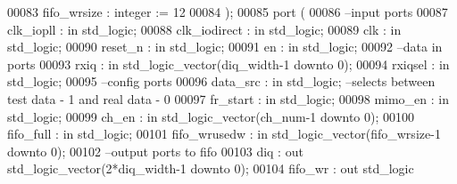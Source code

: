 \begin{DoxyCode}
00083                 fifo_wrsize     : \textcolor{comment}{integer}   := \textcolor{vhdllogic}{}\textcolor{vhdllogic}{12}
00084                 );
00085   \textcolor{keywordflow}{port} (
00086 \textcolor{keyword}{      --input ports}
00087         clk_iopll       : \textcolor{keywordflow}{in} \textcolor{comment}{std\_logic};
00088         clk_iodirect    : \textcolor{keywordflow}{in} \textcolor{comment}{std\_logic}; 
00089       clk               : \textcolor{keywordflow}{in} \textcolor{comment}{std\_logic};
00090       reset_n           : \textcolor{keywordflow}{in} \textcolor{comment}{std\_logic};
00091         en                  : \textcolor{keywordflow}{in} \textcolor{comment}{std\_logic};
00092 \textcolor{keyword}{        --data in ports}
00093         rxiq                : \textcolor{keywordflow}{in} \textcolor{comment}{std\_logic\_vector}(diq_width\textcolor{vhdlchar}{-}\textcolor{vhdllogic}{}\textcolor{vhdllogic}{1} \textcolor{keywordflow}{downto} \textcolor{vhdllogic}{}\textcolor{vhdllogic}{0});
00094         rxiqsel         : \textcolor{keywordflow}{in} \textcolor{comment}{std\_logic};
00095 \textcolor{keyword}{        --config ports}
00096         data_src            : \textcolor{keywordflow}{in} \textcolor{comment}{std\_logic}; \textcolor{keyword}{--selects between test data  - 1 and real data - 0  }
00097         fr_start            : \textcolor{keywordflow}{in} \textcolor{comment}{std\_logic};
00098         mimo_en         : \textcolor{keywordflow}{in} \textcolor{comment}{std\_logic};
00099         ch_en               : \textcolor{keywordflow}{in} \textcolor{comment}{std\_logic\_vector}(ch_num\textcolor{vhdlchar}{-}\textcolor{vhdllogic}{}\textcolor{vhdllogic}{1} \textcolor{keywordflow}{downto} \textcolor{vhdllogic}{}\textcolor{vhdllogic}{0});
00100         fifo_full       : \textcolor{keywordflow}{in} \textcolor{comment}{std\_logic};
00101         fifo_wrusedw    : \textcolor{keywordflow}{in} \textcolor{comment}{std\_logic\_vector}(fifo_wrsize\textcolor{vhdlchar}{-}\textcolor{vhdllogic}{}\textcolor{vhdllogic}{1} \textcolor{keywordflow}{downto} \textcolor{vhdllogic}{}\textcolor{vhdllogic}{0});  
00102 \textcolor{keyword}{      --output ports to fifo}
00103         diq             : \textcolor{keywordflow}{out} \textcolor{comment}{std\_logic\_vector}(\textcolor{vhdllogic}{}\textcolor{vhdllogic}{2}*diq_width\textcolor{vhdlchar}{-}\textcolor{vhdllogic}{}\textcolor{vhdllogic}{1} \textcolor{keywordflow}{downto} \textcolor{vhdllogic}{}\textcolor{vhdllogic}{0});
00104         fifo_wr         : \textcolor{keywordflow}{out} \textcolor{comment}{std\_logic}

\end{DoxyCode}
